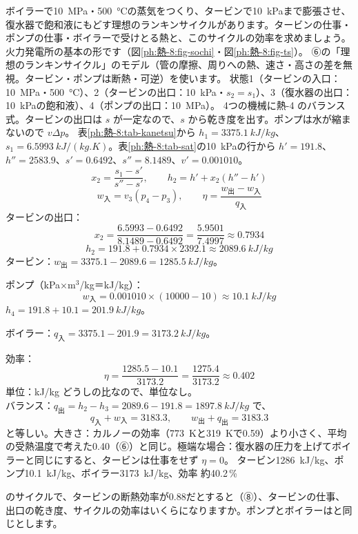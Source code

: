 \begin{phreidai}[ランキンサイクルの効率を計算する]
\label{ph:熱-8:ex6}ボイラーで\qty{10}{MPa}・\qty{500}{\celsius}の蒸気をつくり、タービンで\qty{10}{kPa}まで膨張させ、復水器で飽和液にもどす理想のランキンサイクルがあります。タービンの仕事・ポンプの仕事・ボイラーで受けとる熱と、このサイクルの効率を求めましょう。
\phbamen
火力発電所の基本の形です（図\ref{ph:熱-8:fig-sochi}・図\ref{ph:熱-8:fig-ts}）。
\phmushi
⑥の「理想のランキンサイクル」のモデル（管の摩擦、周りへの熱、速さ・高さの差を無視。タービン・ポンプは断熱・可逆）を使います。
\phzu
状態1（タービンの入口：\qty{10}{MPa}・\qty{500}{\celsius}）、2（タービンの出口：\qty{10}{kPa}・$s_2=s_1$）、3（復水器の出口：\qty{10}{kPa}の飽和液）、4（ポンプの出口：\qty{10}{MPa}）。
\phriyu
4つの機械に熱-4 のバランス式。タービンの出口は $s$ が一定なので、$s$ から乾き度を出す。ポンプは水が縮まないので $v\Delta p$。
\phtateru
表\ref{ph:熱-8:tab-kanetsu}から $h_1=\qty{3375.1}{kJ/kg}$、$s_1=\qty{6.5993}{kJ/(kg.K)}$。表\ref{ph:熱-8:tab-sat}の\qty{10}{kPa}の行から $h'=191.8$、$h''=2583.9$、$s'=0.6492$、$s''=8.1489$、$v'=0.001010$。
\[ x_2=\frac{s_1-s'}{s''-s'},\qquad h_2=h'+x_2(h''-h') \]
\[ w_{\text{入}}=v_3(p_4-p_3),\qquad \eta=\frac{w_{\text{出}}-w_{\text{入}}}{q_{\text{入}}} \]
\phtoku
タービンの出口：
\[ x_2=\frac{6.5993-0.6492}{8.1489-0.6492}=\frac{5.9501}{7.4997}\approx0.7934 \]
\[ h_2=191.8+0.7934\times2392.1\approx\qty{2089.6}{kJ/kg} \]
タービン：$w_{\text{出}}=3375.1-2089.6=\qty{1285.5}{kJ/kg}$。

ポンプ（kPa×m$^3$/kg＝kJ/kg）：
\[ w_{\text{入}}=0.001010\times(\num{10000}-10)\approx\qty{10.1}{kJ/kg} \]
$h_4=191.8+10.1=\qty{201.9}{kJ/kg}$。

ボイラー：$q_{\text{入}}=3375.1-201.9=\qty{3173.2}{kJ/kg}$。

効率：
\[ \eta=\frac{1285.5-10.1}{3173.2}=\frac{1275.4}{3173.2}\approx0.402 \]
\phtashikame
単位：kJ/kg どうしの比なので、単位なし。\\
バランス：$q_{\text{出}}=h_2-h_3=2089.6-191.8=\qty{1897.8}{kJ/kg}$ で、
\[ q_{\text{入}}+w_{\text{入}}=3183.3,\qquad w_{\text{出}}+q_{\text{出}}=3183.3 \]
と等しい。大きさ：カルノーの効率（\qty{773}{K}と\qty{319}{K}で0.59）より小さく、平均の受熱温度で考えた0.40（⑥）と同じ。極端な場合：復水器の圧力を上げてボイラーと同じにすると、タービンは仕事をせず $\eta=0$。
\kotae タービン\qty{1286}{kJ/kg}、ポンプ\qty{10.1}{kJ/kg}、ボイラー\qty{3173}{kJ/kg}、効率 約40.2\,\%
\end{phreidai}
\begin{jibun}
のサイクルで、タービンの断熱効率が0.88だとすると（⑧）、タービンの仕事、出口の乾き度、サイクルの効率はいくらになりますか。ポンプとボイラーはと同じとします。
\end{jibun}

